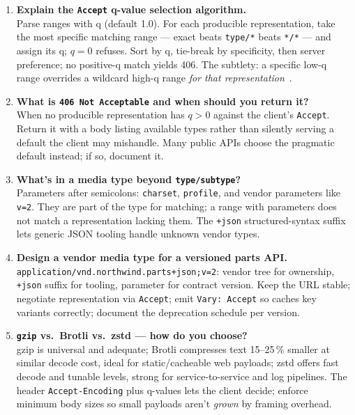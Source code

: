 \begin{enumerate}[label=\textbf{Q\arabic*.}, leftmargin=1.3cm, itemsep=0.8em]
\item \textbf{Explain the \texttt{Accept} q-value selection algorithm.}\\
Parse ranges with q (default 1.0). For each producible representation, take the
most specific matching range --- exact beats \texttt{type/*} beats \texttt{*/*} ---
and assign its q; $q{=}0$ refuses. Sort by q, tie-break by specificity, then server
preference; no positive-q match yields 406. The subtlety: a specific low-q range
overrides a wildcard high-q range \emph{for that representation}~\cite{rfc9110}.

\item \textbf{What is \texttt{406 Not Acceptable} and when should you return it?}\\
When no producible representation has $q > 0$ against the client's
\texttt{Accept}. Return it with a body listing available types rather than
silently serving a default the client may mishandle. Many public APIs choose the
pragmatic default instead; if so, document it.

\item \textbf{What's in a media type beyond \texttt{type/subtype}?}\\
Parameters after semicolons: \texttt{charset}, \texttt{profile}, and vendor
parameters like \texttt{v=2}. They are part of the type for matching; a range with
parameters does not match a representation lacking them. The \texttt{+json}
structured-syntax suffix lets generic JSON tooling handle unknown vendor types.

\item \textbf{Design a vendor media type for a versioned parts API.}\\
\texttt{application/vnd.northwind.parts+json;v=2}: vendor tree for ownership,
\texttt{+json} suffix for tooling, parameter for contract version. Keep the URL
stable; negotiate representation via \texttt{Accept}; emit \texttt{Vary: Accept}
so caches key variants correctly; document the deprecation schedule per version.

\item \textbf{\texttt{gzip} vs.\ Brotli vs.\ zstd --- how do you choose?}\\
gzip is universal and adequate; Brotli compresses text 15--25\,\% smaller at
similar decode cost, ideal for static/cacheable web payloads; zstd offers
fast decode and tunable levels, strong for service-to-service and log pipelines.
The header \texttt{Accept-Encoding} plus q-values lets the client decide; enforce
minimum body sizes so small payloads aren't \emph{grown} by framing overhead.


\end{enumerate}
